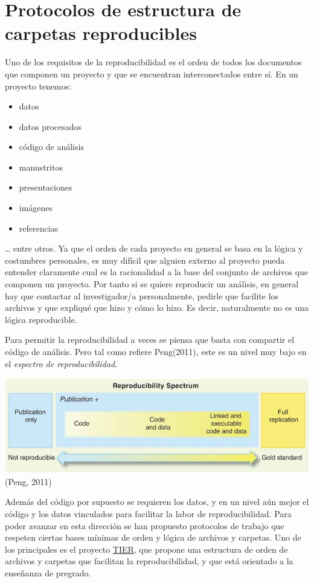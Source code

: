 \documentclass[
  11pt,
]{book}
\providecommand{\tightlist}{%
  \setlength{\itemsep}{0pt}\setlength{\parskip}{0pt}}
\begin{document}
\hypertarget{protocolos-de-estructura-de-carpetas-reproducibles}{%
\section{Protocolos de estructura de carpetas reproducibles}\label{protocolos-de-estructura-de-carpetas-reproducibles}}

Uno de los requisitos de la reproducibilidad es el orden de todos los documentos que componen un proyecto y que se encuentran interconectados entre sí. En un proyecto tenemos:

\begin{itemize}
\tightlist
\item
  datos
\item
  datos procesados
\item
  código de análisis
\item
  manustritos
\item
  presentaciones
\item
  imágenes
\item
  referencias
\end{itemize}

\ldots{} entre otros. Ya que el orden de cada proyecto en general se basa en la lógica y costumbres personales, es muy difícil que alguien externo al proyecto pueda entender claramente cual es la racionalidad a la base del conjunto de archivos que componen un proyecto. Por tanto si se quiere reproducir un análisis, en general hay que contactar al investigador/a personalmente, pedirle que facilite los archivos y que expliqué que hizo y cómo lo hizo. Es decir, naturalmente no es una lógica reproducible.

Para permitir la reproducibilidad a veces se piensa que basta con compartir el código de análisis. Pero tal como refiere Peng(2011), este es un nivel muy bajo en el \emph{espectro de reproducibilidad}.

\includegraphics{images/peng_spectrum.png}
(Peng, 2011)

Además del código por supuesto se requieren los datos, y en un nivel aún mejor el código y los datos vinculados para facilitar la labor de reproducibilidad. Para poder avanzar en esta dirección se han propuesto protocolos de trabajo que respeten ciertas bases mínimas de orden y lógica de archivos y carpetas. Uno de los principales es el proyecto \href{https://www.projecttier.org/}{TIER}, que propone una estructura de orden de archivos y carpetas que facilitan la reproducibilidad, y que está orientado a la enseñanza de pregrado.
\end{document}
